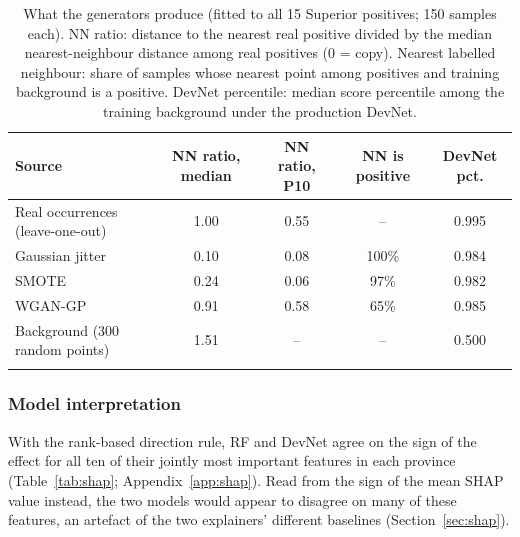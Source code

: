 \documentclass[pdflatex,sn-apa]{sn-jnl}
\begin{document}
\begin{table}[t]
\caption{What the generators produce (fitted to all 15 Superior positives; 150 samples each). NN ratio: distance to the nearest real positive divided by the median nearest-neighbour distance among real positives (0 = copy). Nearest labelled neighbour: share of samples whose nearest point among positives and training background is a positive. DevNet percentile: median score percentile among the training background under the production DevNet.}\label{tab:aug-diag}
\footnotesize
\setlength{\tabcolsep}{2.5pt}
\begin{tabular*}{\textwidth}{@{\extracolsep\fill}lcccc}
\toprule
Source & NN ratio, median & NN ratio, P10 & NN is positive & DevNet pct. \\
\midrule
Real occurrences (leave-one-out) & 1.00 & 0.55 & -- & 0.995 \\
Gaussian jitter & 0.10 & 0.08 & 100\% & 0.984 \\
SMOTE & 0.24 & 0.06 & 97\% & 0.982 \\
WGAN-GP & 0.91 & 0.58 & 65\% & 0.985 \\
Background (300 random points) & 1.51 & -- & -- & 0.500 \\
\botrule
\end{tabular*}
\end{table}

\subsubsection{Model interpretation}\label{sec:res-shap}

With the rank-based direction rule, RF and DevNet agree on the sign of the effect for all ten of their jointly most important features in each province (Table~\ref{tab:shap}; Appendix~\ref{app:shap}). Read from the sign of the mean SHAP value instead, the two models would appear to disagree on many of these features, an artefact of the two explainers' different baselines (Section~\ref{sec:shap}).
\end{document}
